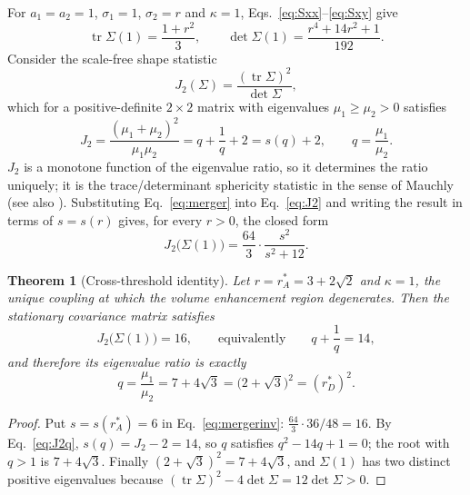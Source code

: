 \documentclass[11pt]{article}
\theoremstyle{plain}
\newtheorem{theorem}{Theorem}
\theoremstyle{remark}
\newcommand{\tr}{\operatorname{tr}}
\newcommand{\rA}{r_A^{*}}
\newcommand{\rD}{r_D^{*}}
\begin{document}
For $a_1=a_2=1$, $\sigma_1=1$, $\sigma_2=r$ and $\kappa=1$, Eqs.~\eqref{eq:Sxx}--\eqref{eq:Sxy}
give
\begin{equation}
  \tr\Sigma(1)=\frac{1+r^2}{3},
  \qquad
  \det\Sigma(1)=\frac{r^4+14r^2+1}{192} . \label{eq:merger}
\end{equation}
Consider the scale-free shape statistic
\begin{equation}
  J_2(\Sigma)=\frac{(\tr\Sigma)^2}{\det\Sigma}, \label{eq:J2}
\end{equation}
which for a positive-definite $2\times2$ matrix with eigenvalues $\mu_1\ge\mu_2>0$ satisfies
\begin{equation}
  J_2=\frac{(\mu_1+\mu_2)^2}{\mu_1\mu_2}=q+\frac1q+2=s(q)+2,
  \qquad q=\frac{\mu_1}{\mu_2} . \label{eq:J2q}
\end{equation}
$J_2$ is a monotone function of the eigenvalue ratio, so it determines the ratio uniquely;
it is the trace/determinant sphericity statistic in the sense of Mauchly \cite{Mauchly1940}
(see also \cite{Muirhead1982,WolkowiczStyan1980}). Substituting
Eq.~\eqref{eq:merger} into Eq.~\eqref{eq:J2} and writing the result in terms of $s=s(r)$ gives,
for every $r>0$, the closed form
\begin{equation}
  J_2\bigl(\Sigma(1)\bigr)=\frac{64}{3}\cdot\frac{s^2}{s^2+12} . \label{eq:mergerinv}
\end{equation}

\begin{theorem}[Cross-threshold identity]\label{thm:cross}
Let $r=\rA=3+2\sqrt2$ and $\kappa=1$, the unique coupling at which the volume enhancement
region degenerates. Then the stationary covariance matrix satisfies
\begin{equation}
  J_2\bigl(\Sigma(1)\bigr)=16,
  \qquad\text{equivalently}\qquad
  q+\frac1q=14, \label{eq:J216}
\end{equation}
and therefore its eigenvalue ratio is exactly
\begin{equation}
  q=\frac{\mu_1}{\mu_2}=7+4\sqrt3=\bigl(2+\sqrt3\bigr)^2=(\rD)^2 . \label{eq:cross}
\end{equation}
\end{theorem}

\begin{proof}
Put $s=s(\rA)=6$ in Eq.~\eqref{eq:mergerinv}: $\tfrac{64}{3}\cdot36/48=16$. By
Eq.~\eqref{eq:J2q}, $s(q)=J_2-2=14$, so $q$ satisfies $q^2-14q+1=0$; the root with $q>1$ is
$7+4\sqrt3$. Finally $(2+\sqrt3)^2=7+4\sqrt3$, and $\Sigma(1)$ has two distinct positive
eigenvalues because $(\tr\Sigma)^2-4\det\Sigma=12\det\Sigma>0$.
\end{proof}
\end{document}
